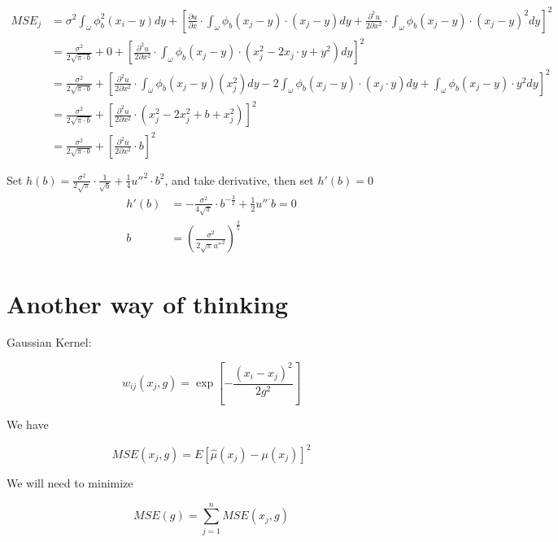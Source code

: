 \documentclass{article}
\begin{document}
\begin{align}
     MSE_j &=  \sigma^2 \int_\omega  \phi_b^2(x_i-y)dy  +  \left[ \frac{\partial u}{\partial x}\cdot \int_\omega  \phi_b(x_j-y)\cdot(x_j - y)dy + \frac{\partial^2 u}{2\partial x^2}\cdot \int_{\omega}  \phi_b(x_j-y)\cdot(x_j - y)^2 dy\right]^2\\
     &= \frac{\sigma^2}{2\sqrt{\pi \cdot b}}   + 0 + \left[ \frac{\partial^2 u}{2\partial x^2}\cdot \int_{\omega}  \phi_b(x_j-y)\cdot(x^2_j -2x_j\cdot y + y^2) dy\right]^2\\
     &=  \frac{\sigma^2}{2\sqrt{\pi \cdot b}}   + \left[ \frac{\partial^2 u}{2\partial x^2}\cdot \int_{\omega}  \phi_b(x_j-y)(x^2_j)dy - 2 \int_{\omega}  \phi_b(x_j-y)\cdot (x_j\cdot y)dy +  \int_{\omega}  \phi_b(x_j-y)\cdot y^2 dy\right]^2\\
     &=  \frac{\sigma^2}{2\sqrt{\pi \cdot b}}   + \left[\frac{\partial^2 u}{2\partial x^2}\cdot (x^2_j - 2x^2_j + b + x^2_j) \right]^2\\
     &=  \frac{\sigma^2}{2\sqrt{\pi \cdot b}}  + \left[\frac{\partial^2 u}{2\partial x^2}\cdot b \right]^2
\end{align}



Set $h(b) = \frac{\sigma^2}{2\sqrt{\pi}}\cdot \frac{1}{\sqrt{b}}+   \frac{1}{4}   u''^2\cdot b^2$, and take derivative, then set $h'(b) = 0$
\begin{align}
    h'(b)&= -\frac{\sigma^2}{4\sqrt{\pi}}\cdot b^{-\frac{3}{2}}+\frac{1}{2} u''^\cdot b = 0\\
    b &=\left(\frac{\sigma^2}{2\sqrt{\pi} u''^2}\right)^{\frac{2}{5}} 
\end{align}











\section{Another way of thinking}

Gaussian Kernel: 

$$w_{ij}(x_j, g)  = \exp[- \frac{(x_i - x_j)^2}{2g^2}]$$

We have 

$$MSE(x_j, g) = E[\hat{\mu}(x_j) - \mu(x_j)]^2$$

We will need to minimize 

$$MSE(g) = \sum_{j=1}^n MSE(x_j, g)$$
\end{document}

